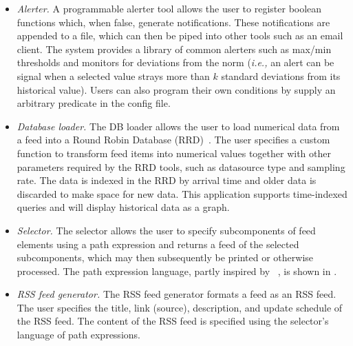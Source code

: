 \begin{itemize}
\item {\em Alerter.} A programmable alerter tool allows the user to register boolean 
functions which, when false, generate notifications.  These notifications are appended to
a file, which can then be piped into other tools such as an email
client.  The system provides a library of 
common alerters such as max/min thresholds and monitors for deviations from the norm
({\em i.e.,} an alert can be signal when a selected value strays more than $k$
standard deviations from its historical value). 
Users can also program their own conditions by supply an arbitrary \ocaml{} predicate
in the config file.  

\item {\em Database loader.} The DB loader allows the user to load numerical
data from a feed into a Round Robin Database (RRD)~\cite{rrdtool}. The user specifies
a custom function to transform feed items into numerical values together with other parameters required by the RRD tools, such as datasource
type and sampling rate. The data is indexed in the RRD by arrival time and
older data is discarded to make space for new data.  This application supports
time-indexed queries and will display historical data as a graph.

\item {\em Selector.} The selector allows the user to specify subcomponents of feed elements 
using a path expression and returns a feed of the selected subcomponents, which may then
subsequently be printed or otherwise processed. The path expression 
language, partly inspired by \xpath{}~\cite{xpath}, is shown in .

\item {\em RSS feed generator.} The RSS feed generator formats a
\padsd{} feed as an RSS feed. The user specifies
the title, link (source), description, and update schedule of the RSS feed.
The content of the RSS feed is specified using the selector's language of path 
expressions. 
\end{itemize}



